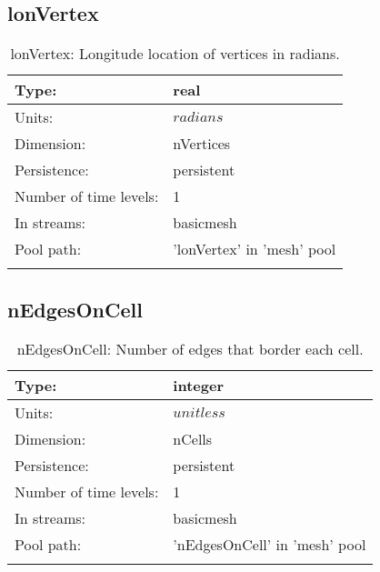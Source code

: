 \subsection[lonVertex]{lonVertex}
\label{subsec:var_sec_mesh_lonVertex}
\begin{center}
\begin{longtable}{| p{2.0in} | p{4.0in} |}
        \hline 
        Type: & real \\
        \hline 
        Units: & $radians$ \\
        \hline 
        Dimension: & nVertices \\
        \hline 
        Persistence: & persistent \\
        \hline 
        Number of time levels: & 1 \\
        \hline 
		 In streams: &  basicmesh \\
        \hline 
            Pool path: & 'lonVertex' in 'mesh' pool
 \\
		 \hline 
    \caption{lonVertex: Longitude location of vertices in radians.}
\end{longtable}
\end{center}
\subsection[nEdgesOnCell]{nEdgesOnCell}
\label{subsec:var_sec_mesh_nEdgesOnCell}
\begin{center}
\begin{longtable}{| p{2.0in} | p{4.0in} |}
        \hline 
        Type: & integer \\
        \hline 
        Units: & $unitless$ \\
        \hline 
        Dimension: & nCells \\
        \hline 
        Persistence: & persistent \\
        \hline 
        Number of time levels: & 1 \\
        \hline 
		 In streams: &  basicmesh \\
        \hline 
            Pool path: & 'nEdgesOnCell' in 'mesh' pool
 \\
		 \hline 
    \caption{nEdgesOnCell: Number of edges that border each cell.}
\end{longtable}
\end{center}
